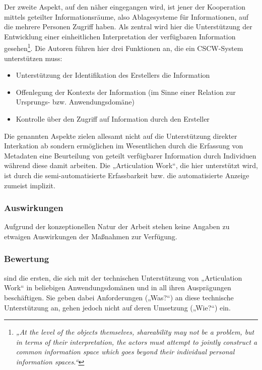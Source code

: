 Der zweite Aspekt, auf den näher eingegangen wird, ist jener der Kooperation mittels geteilter Informationsräume, also Ablagesysteme für Informationen, auf die mehrere Personen Zugriff haben. Als zentral wird hier die Unterstützung der Entwicklung einer einheitlichen Interpretation der verfügbaren Information gesehen\footnote{\emph{„At the level of the objects themselves, shareability may not be a problem, but in terms of their interpretation, the actors must attempt to jointly construct a common information space which goes beyond their individual personal information spaces.“}\citep[][S. 21]{Schmidt92}}. Die Autoren führen hier drei Funktionen an, die ein \gls{CSCW}-System unterstützen muss:
\begin{itemize}
	\item Unterstützung der Identifikation des Erstellers die Information
	\item Offenlegung der Kontexts der Information (im Sinne einer Relation zur Ursprungs- bzw. Anwendungsdomäne)
	\item Kontrolle über den Zugriff auf Information durch den Ersteller
\end{itemize}
Die genannten Aspekte zielen allesamt nicht auf die Unterstützung direkter Interkation ab sondern ermöglichen im Wesentlichen durch die Erfassung von Metadaten eine Beurteilung von geteilt verfügbarer Information durch Individuen während diese damit arbeiten. Die „Articulation Work“, die hier unterstützt wird, ist durch die semi-automatisierte Erfassbarkeit bzw. die automatisierte Anzeige zumeist implizit. 

\subsubsection{Auswirkungen}

Aufgrund der konzeptionellen Natur der Arbeit stehen keine Angaben zu etwaigen Auswirkungen der Maßnahmen zur Verfügung.

\subsubsection{Bewertung}

\citet{Schmidt92} sind die ersten, die sich mit der technischen Unterstützung von „Articulation Work“ in beliebigen Anwendungsdomänen und in all ihren Ausprägungen beschäftigen. Sie geben dabei Anforderungen („Was?“) an diese technische Unterstützung an, gehen jedoch nicht auf deren Umsetzung („Wie?“) ein.

